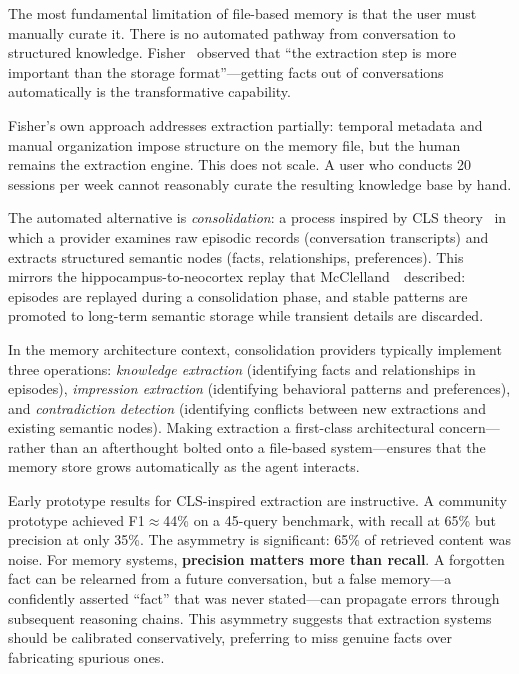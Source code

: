 The most fundamental limitation of file-based memory is that the user
must manually curate it.  There is no automated pathway from
conversation to structured knowledge.  Fisher~\cite{fisher2026}
observed that ``the extraction step is more important than the storage
format''---getting facts out of conversations automatically is the
transformative capability.

Fisher's own approach addresses extraction partially: temporal metadata
and manual organization impose structure on the memory file, but the
human remains the extraction engine.  This does not scale.  A user who
conducts 20 sessions per week cannot reasonably curate the resulting
knowledge base by hand.

The automated alternative is \emph{consolidation}: a process inspired
by CLS theory~\cite{mcclelland1995} in which a provider examines raw
episodic records (conversation transcripts) and extracts structured
semantic nodes (facts, relationships, preferences).  This mirrors the
hippocampus-to-neocortex replay that McClelland~\etal\ described:
episodes are replayed during a consolidation phase, and stable patterns
are promoted to long-term semantic storage while transient details are
discarded.

In the memory architecture context, consolidation providers typically
implement three operations: \emph{knowledge extraction} (identifying
facts and relationships in episodes), \emph{impression extraction}
(identifying behavioral patterns and preferences), and
\emph{contradiction detection} (identifying conflicts between new
extractions and existing semantic nodes).  Making extraction a
first-class architectural concern---rather than an afterthought bolted
onto a file-based system---ensures that the memory store grows
automatically as the agent interacts.

Early prototype results for CLS-inspired extraction are instructive.
A community prototype achieved F1$\approx$44\% on a 45-query
benchmark, with recall at 65\% but precision at only 35\%.  The
asymmetry is significant: 65\% of retrieved content was noise.  For
memory systems, \textbf{precision matters more than recall}.  A
forgotten fact can be relearned from a future conversation, but a false
memory---a confidently asserted ``fact'' that was never stated---can
propagate errors through subsequent reasoning chains.  This asymmetry
suggests that extraction systems should be calibrated conservatively,
preferring to miss genuine facts over fabricating spurious ones.


